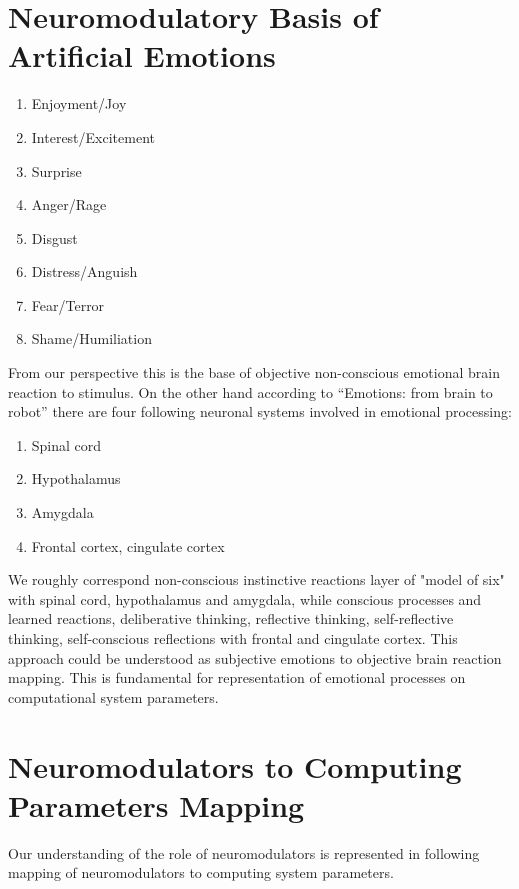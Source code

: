 \section{Neuromodulatory Basis of Artificial Emotions}

\begin{enumerate}
 \item  Enjoyment/Joy
 \item  Interest/Excitement
 \item  Surprise
 \item  Anger/Rage
 \item  Disgust
 \item  Distress/Anguish
 \item  Fear/Terror
 \item  Shame/Humiliation
\end{enumerate}

From our perspective this is the base of objective non-conscious emotional brain reaction to stimulus. On the other hand according to ``Emotions: from brain to robot'' \cite{emotionsbraintorobot} there are four following neuronal systems involved in emotional processing:

\begin{enumerate}
 \item  Spinal cord
 \item  Hypothalamus
 \item  Amygdala
 \item  Frontal cortex, cingulate cortex
\end{enumerate}

We roughly correspond non-conscious instinctive reactions layer of "model of six" \cite{emotionmachine} with spinal cord, hypothalamus and amygdala, while conscious processes and learned reactions, deliberative thinking, reflective thinking, self-reflective thinking, self-conscious reflections with frontal and cingulate cortex. This approach could be understood as subjective emotions to objective brain reaction mapping. This is fundamental for representation of emotional processes on computational system parameters.

\section{Neuromodulators to Computing Parameters Mapping}

Our understanding of the role of neuromodulators \cite{cubeofemotions, emotionsbraintorobot} is represented in following mapping of neuromodulators to computing system parameters.

